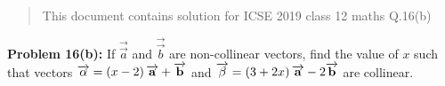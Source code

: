 \documentclass[journal,12pt,twocolumn]{IEEEtran}
\begin{document}
\maketitle

\newpage


\bigskip

\begin{abstract}
This document contains solution for ICSE 2019 class 12 maths Q.16(b)  
\end{abstract}

\textbf{Problem 16(b): } If $\overrightarrow{\vec{a}}$ and $\overrightarrow{\vec{b}}$ are non-collinear vectors, find the value of $x$ such that vectors $\overrightarrow{\mathbf{\alpha}} = \left(x-2\right)\overrightarrow{\mathbf{a}} + \overrightarrow{\mathbf{b}}$ and $\overrightarrow{\mathbf{\beta}} = \left(3 + 2x\right)\overrightarrow{\mathbf{a}} - 2\overrightarrow{\mathbf{b}}$ are collinear.
\end{document}
